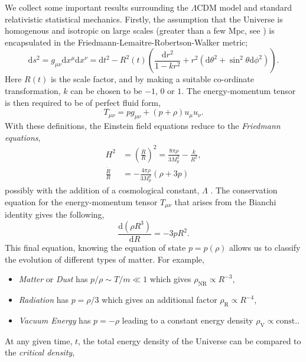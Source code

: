 \documentclass[11pt]{article}
\numberwithin{equation}{section}
\numberwithin{figure}{section}
\numberwithin{table}{section}
\begin{document}
We collect some important results surrounding the $\Lambda$CDM model and standard relativistic statistical mechanics. Firstly, the assumption that the Universe is homogenous and isotropic on large scales (greater than a few Mpc, see \citet{Fukugita:1993hc}) is encapsulated in the Friedmann-Lemaitre-Robertson-Walker metric;
\begin{equation}
\mathrm{d}s^2 = g_{\mu\nu}\mathrm{d}x^\mu \mathrm{d}x^\nu = \mathrm{d}t^2 - R^2(t) \left(\frac{\mathrm{d}r^2}{1 - kr^2} + r^2(\mathrm{d}\theta^2 + \sin^2\theta \mathrm{d}\phi^2)\right).
\end{equation}
Here $R(t)$ is the scale factor, and by making a suitable co-ordinate transformation, $k$ can be chosen to be $-1$, $0$ or $1$. The energy-momentum tensor is then required to be of perfect fluid form,
\begin{equation}
T_{\mu\nu} = p g_{\mu\nu} + (p + \rho)u_\mu u_\nu.
\end{equation}
With these definitions, the Einstein field equations reduce to the \textit{Friedmann equations},
\begin{align}
H^2 &= \left(\frac{\dot{R}}{R}\right)^2 = \frac{8\pi \rho}{3M_p^2} - \frac{k}{R^2}, \\
\frac{\ddot{R}}{R} &= -\frac{4\pi \rho}{3 M_p^2}(\rho + 3p)
\end{align}
possibly with the addition of a cosmological constant, $\Lambda$ \citep{Weinberg:1988cp}. The conservation equation for the energy-momentum tensor $T_{\mu\nu}$ that arises from the Bianchi identity gives the following,
\begin{equation}
\frac{\mathrm{d}(\rho R^3)}{\mathrm{d}R} = -3p R^2. \label{eq:cons}
\end{equation}
This final equation, knowing the equation of state $p = p(\rho)$ allows us to classify the evolution of different types of matter. For example,
\begin{itemize}
\item \textit{Matter} or \textit{Dust} has $p/\rho \sim T/m \ll 1$ which gives $\rho_{\mathrm{NR}} \propto R^{-3}$,
\item \textit{Radiation} has $p = \rho/3$ which gives an additional factor $\rho_{\mathrm{R}} \propto R^{-4}$,
\item \textit{Vacuum Energy} has $p = -\rho$ leading to a constant energy density $\rho_{\mathrm{V}} \propto \mathrm{const.}$.
\end{itemize}
At any given time, $t$, the total energy density of the Universe can be compared to the \textit{critical density},
\end{document}
